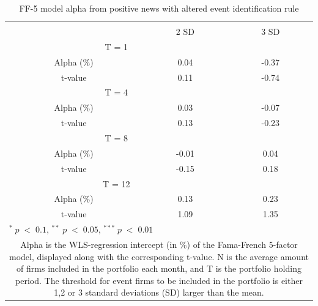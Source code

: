 \setlength{\tabcolsep}{15pt}
\begin{table}[H]
\small
\centering
\caption{FF-5 model alpha from positive news with altered event identification rule } 
\begin{tabular}{ccc}
\hline \hline \\ 
&  2 SD  &  3 SD   \\ \cline{2-3} 
 \multicolumn{2}{c}{ T = 1}  \\ \hline
 Alpha (\%) & 0.04  & -0.37   \\
 t-value & 0.11  & -0.74  \\
 \multicolumn{2}{c}{ T = 4}  \\ \hline
 Alpha (\%)  & 0.03  &  -0.07  \\
 t-value  & 0.13  & -0.23  \\
 \multicolumn{2}{c}{ T = 8}  \\ \hline
 Alpha (\%) & -0.01  & 0.04   \\
 t-value & -0.15 & 0.18  \\
 \multicolumn{2}{c}{ T = 12}  \\ \hline
 Alpha (\%) & 0.13  & 0.23   \\
 t-value & 1.09 & 1.35  \\
 \hline \hline
 \multicolumn{3}{l}{ \footnotesize $^* \; p\; <\; 0.1$, $ ^{**} \; p\; <\; 0.05$, $ ^{***} \; p\; <\; 0.01$  } \\
 \multicolumn{3}{p{5cm}}{ \footnotesize Alpha is the WLS-regression intercept (in \%) of the Fama-French 5-factor model, displayed along with the corresponding t-value. N is the average amount of firms included in the portfolio each month, and T is the portfolio holding period. The threshold for event firms to be included in the portfolio is either 1,2 or 3 standard deviations (SD) larger than the mean.}  \\ 
\end{tabular}
\label{tab: FF5_pos}
\end{table}
